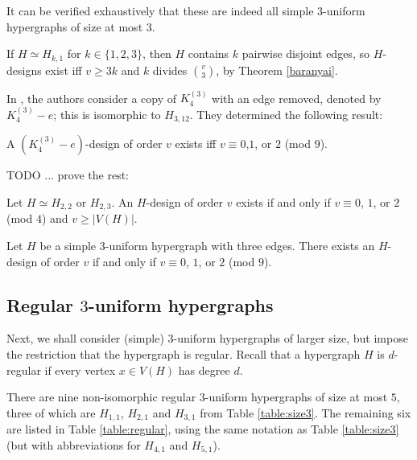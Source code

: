 It can be verified exhaustively that these are indeed all simple $3$-uniform hypergraphs of size at most 3.

If $H \simeq H_{k,1}$ for $k \in \{1, 2, 3\}$, then $H$ contains $k$ pairwise disjoint edges, so $H$-designs exist iff $v \geq 3k$ and $k$ divides ${v \choose 3}$, by Theorem \ref{baranyai}.


In \cite{feng-chang2}, the authors consider a copy of $K_4^{(3)}$ with an edge removed, denoted by $K_4^{(3)} - e$; this is isomorphic to $H_{3,12}$. They determined the following result:

\begin{theorem} \label{thm:H_3,12}
A $(K_4^{(3)}-e)$-design of order $v$ exists iff $v \equiv 0$,$1$, or $2$ (mod $9$).
\end{theorem}


\vspace{1cm} TODO ... prove the rest:

\begin{theorem} \label{thm:H_22,H_23}
Let $H \simeq H_{2,2}$ or $H_{2,3}$.
An $H$-design of order $v$ exists if and only if $v \equiv 0$, $1$, or $2$ (mod $4$) and $v \geq |V(H)|$.
\end{theorem}

\begin{theorem} \label{thm:H_3,i}
Let $H$ be a simple $3$-uniform hypergraph with three edges.
There exists an $H$-design of order $v$ if and only if $v \equiv 0$, $1$, or $2$ (mod $9$).
\end{theorem}

\vspace{1cm}


\subsection{Regular $3$-uniform hypergraphs}

Next, we shall consider (simple) $3$-uniform hypergraphs of larger size, but impose the restriction that the hypergraph is regular.
Recall that a hypergraph $H$ is $d$-regular if every vertex $x \in V(H)$ has degree $d$.

There are nine non-isomorphic regular $3$-uniform hypergraphs of size at most $5$, three of which are $H_{1,1}$, $H_{2,1}$ and $H_{3,1}$ from Table \ref{table:size3}.
The remaining six are listed in Table \ref{table:regular}, using the same notation as Table \ref{table:size3} (but with abbreviations for $H_{4,1}$ and $H_{5,1}$).

